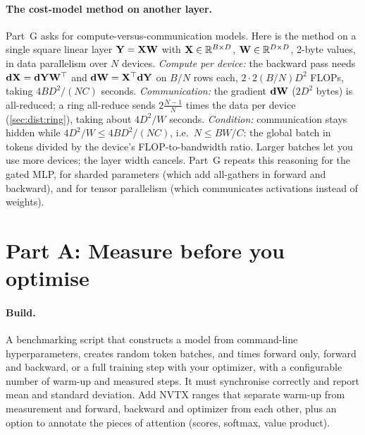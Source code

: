 \paragraph{The cost-model method on another layer.} Part~G asks for compute-versus-communication
models. Here is the method on a single square linear layer $\mathbf{Y}=\mathbf{X}\mathbf{W}$ with
$\mathbf{X}\in\mathbb{R}^{B\times D}$, $\mathbf{W}\in\mathbb{R}^{D\times D}$, 2-byte values, in data parallelism over
$N$ devices. \emph{Compute per device:} the backward pass needs $\mathbf{dX}=\mathbf{dY}\mathbf{W}^\top$ and
$\mathbf{dW}=\mathbf{X}^\top\mathbf{dY}$ on $B/N$ rows each, $2\cdot2(B/N)D^2$ FLOPs, taking
$4BD^2/(NC)$ seconds. \emph{Communication:} the gradient $\mathbf{dW}$ ($2D^2$ bytes) is all-reduced; a
ring all-reduce sends $2\frac{N-1}{N}$ times the data per device (\cref{sec:dist:ring}), taking about
$4D^2/W$ seconds. \emph{Condition:} communication stays hidden while $4D^2/W\le4BD^2/(NC)$, i.e.\
$N\le BW/C$: the global batch in tokens divided by the device's FLOP-to-bandwidth ratio. Larger batches
let you use more devices; the layer width cancels. Part~G repeats this reasoning for the gated MLP,
for sharded parameters (which add all-gathers in forward and backward), and for tensor parallelism
(which communicates activations instead of weights).

\section{Part A: Measure before you optimise}\label{sec:proj2:a}

\paragraph{Build.} A benchmarking script that constructs a model from command-line hyperparameters,
creates random token batches, and times forward only, forward and backward, or a full training step
with your optimizer, with a configurable number of warm-up and measured steps. It must synchronise
correctly and report mean and standard deviation. Add NVTX ranges that separate warm-up from
measurement and forward, backward and optimizer from each other, plus an option to annotate the
pieces of attention (scores, softmax, value product).

